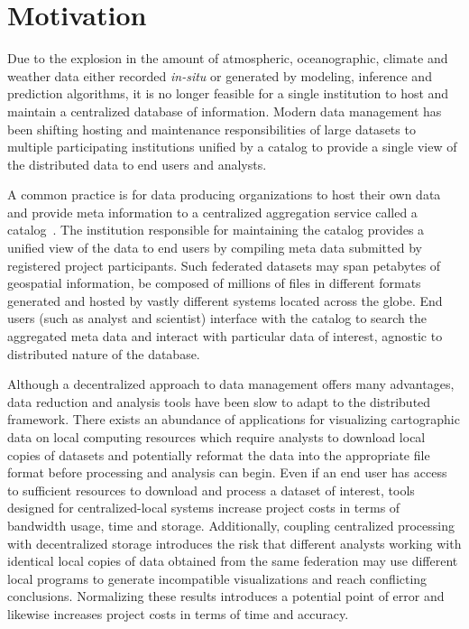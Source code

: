 \section{Motivation}
\label{sec:motivation}
Due to the explosion in the amount of atmospheric, oceanographic,
climate and weather data either recorded \emph{in-situ} or generated
by modeling, inference and prediction algorithms, it is no longer
feasible for a single institution to host and maintain a centralized
database of information. Modern data management has been shifting
hosting and maintenance responsibilities of large datasets to multiple
participating institutions unified by a catalog to provide a single
view of the distributed data to end users and analysts.

A common practice is for data producing organizations to host their
own data and provide meta information to a centralized aggregation
service called a catalog~\cite{luettich13, williams09, chervenak00}. The
institution responsible for maintaining the catalog provides a unified
view of the data to end users by compiling meta data submitted by
registered project participants. Such federated datasets may span
petabytes of geospatial information, be composed of millions of files
in different formats generated and hosted by vastly different systems
located across the globe. End users (such as analyst and scientist)
interface with the catalog to search the aggregated meta data and
interact with particular data of interest, agnostic to distributed
nature of the database.

Although a decentralized approach to data management offers many
advantages, data reduction and analysis tools have been slow to adapt
to the distributed framework. There exists an abundance of
applications for visualizing cartographic data on local computing
resources which require analysts to download local copies of datasets
and potentially reformat the data into the appropriate file format
before processing and analysis can begin. Even if an end user has
access to sufficient resources to download and process a dataset of
interest, tools designed for centralized-local systems increase
project costs in terms of bandwidth usage, time and
storage. Additionally, coupling centralized processing with
decentralized storage introduces the risk that different analysts
working with identical local copies of data obtained from the same
federation may use different local programs to generate incompatible
visualizations and reach conflicting conclusions. Normalizing these
results introduces a potential point of error and likewise increases
project costs in terms of time and accuracy.

